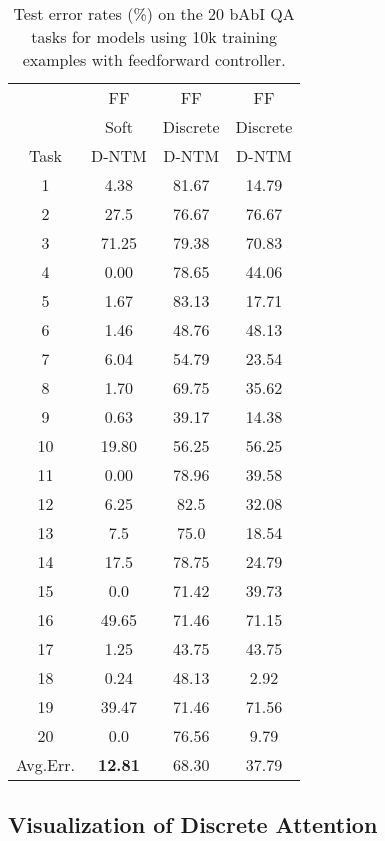 \documentclass[12pt]{article}
\begin{document}
\begin{table*}[htbp]
\vspace{-2mm}
  \centering
  \tiny 
\begin{tabular}{ |c|c|c|c| }
\hline
& FF & FF & FF\\ 
& Soft & Discrete & Discrete\\
Task &  D-NTM & D-NTM & D-NTM\\ \hline
1   &   4.38    &   81.67   &   14.79\\
2   &   27.5    &   76.67   &   76.67\\
3   &   71.25   &   79.38   &   70.83\\
4   &   0.00    &   78.65   &   44.06\\
5   &   1.67    &   83.13   &   17.71\\
6   &   1.46    &   48.76   &   48.13\\
7   &   6.04    &   54.79   &   23.54\\
8   &   1.70    &   69.75   &   35.62\\
9   &   0.63    &   39.17   &   14.38\\
10  &   19.80   &   56.25   &   56.25\\
11  &   0.00    &   78.96   &   39.58\\
12  &   6.25    &   82.5    &   32.08\\
13  &   7.5     &   75.0    &   18.54\\
14  &   17.5    &   78.75   &   24.79\\
15  &   0.0     &   71.42   &   39.73\\
16  &   49.65   &   71.46   &   71.15\\
17  &   1.25    &   43.75   &   43.75\\
18  &   0.24    &   48.13   &   2.92\\
19  &   39.47   &   71.46   &   71.56\\
20  &   0.0     &   76.56   &   9.79\\\hline
Avg.Err. & \textbf{12.81} & 68.30 & 37.79\\\hline
\end{tabular}
\caption{Test error rates (\%) on the 20 bAbI QA tasks for models using 10k training examples with feedforward controller.}
\label{app:babi_10k_soft2}
\end{table*}


\subsection{Visualization of Discrete Attention}
\end{document}
